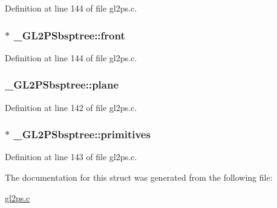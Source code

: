 Definition at line 144 of file gl2ps.\+c.

\hypertarget{struct___g_l2_p_sbsptree_a25786438125ba05b44f2aa2d4ff1fb2c}{}
\subsubsection[{front}]{$\ast$ \+\_\+\+G\+L2\+P\+Sbsptree\+::front}\label{struct___g_l2_p_sbsptree_a25786438125ba05b44f2aa2d4ff1fb2c}


Definition at line 144 of file gl2ps.\+c.

\hypertarget{struct___g_l2_p_sbsptree_a9efcd25df38bdf307566113297414883}{}
\subsubsection[{plane}]{ \+\_\+\+G\+L2\+P\+Sbsptree\+::plane}\label{struct___g_l2_p_sbsptree_a9efcd25df38bdf307566113297414883}


Definition at line 142 of file gl2ps.\+c.

\hypertarget{struct___g_l2_p_sbsptree_a548681245d379e2c0f98ed5189911609}{}
\subsubsection[{primitives}]{$\ast$ \+\_\+\+G\+L2\+P\+Sbsptree\+::primitives}\label{struct___g_l2_p_sbsptree_a548681245d379e2c0f98ed5189911609}


Definition at line 143 of file gl2ps.\+c.



The documentation for this struct was generated from the following file\+:\begin{DoxyCompactItemize}
\item 
\hyperlink{gl2ps_8c}{gl2ps.\+c}\end{DoxyCompactItemize}
